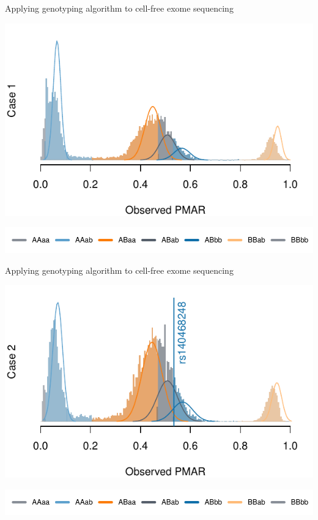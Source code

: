 \documentclass[
  10pt,
  ignorenonframetext,
  m]{beamer}
\begin{document}
\begin{frame}{Applying genotyping algorithm to cell-free exome
sequencing}
\protect\hypertarget{applying-genotyping-algorithm-to-cell-free-exome-sequencing-1}{}

\begin{center}\includegraphics{defense_files/figure-beamer/alleleDepCase1-1} \end{center}

\centering \includegraphics{defense_files/figure-beamer/genoLgnd-1.pdf}

\end{frame}

\begin{frame}{Applying genotyping algorithm to cell-free exome
sequencing}
\protect\hypertarget{applying-genotyping-algorithm-to-cell-free-exome-sequencing-2}{}

\begin{center}\includegraphics{defense_files/figure-beamer/alleleDepCase2-1} \end{center}

\centering \includegraphics{defense_files/figure-beamer/genoLgnd-1.pdf}

\end{frame}
\end{document}
